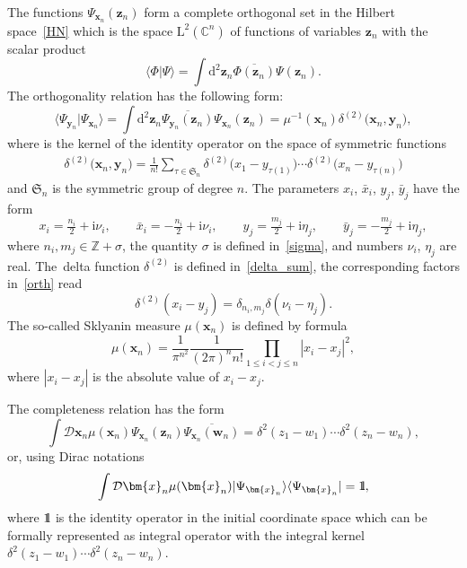 \documentclass[10pt,a4paper]{amsart}
\renewcommand{\imath}{\mathrm{i}}
\newcommand{\II}{\hbox{{1}\kern-.25em\hbox{l}}}
\numberwithin{equation}{section}
\begin{document}
The functions $\Psi_{\bm{x}_n}(\bm{z}_n)$ form a complete orthogonal set in the Hilbert space~\eqref{HN} which is the space $\mathrm{L}^2\left(\mathbb C^{n}\right)$ of functions of
variables $\bm{z}_n$ with the scalar product
\begin{equation*}
	\langle\Phi|\Psi\rangle =
	\int \mathrm{d}^{2}\bm{z}_n \overline{\Phi(\bm{z}_n)} \Psi(\bm{z}_n) .
\end{equation*}
The orthogonality relation has the following form:
\begin{equation} \label{orth}
\langle\Psi_{\bm{y}_n}|\Psi_{\bm{x}_n}\rangle = \int \mathrm{d}^{2}\bm{z}_n \overline{\Psi_{\bm{y}_n}(\bm{z}_n)} \Psi_{\bm{x}_n}(\bm{z}_n) =
	\mu^{-1}(\bm{x}_n) \delta^{(2)}\bigl(\bm{x}_n,\bm{y}_n \bigr) ,
\end{equation}
where  is the kernel of the
identity operator on the space of symmetric functions
\begin{align}\label{deltasym}
\delta^{(2)}\bigl(\bm{x}_n,\bm{y}_n \bigr) =
\frac{1}{n!}\sum\limits_{\tau\in\mathfrak{S}_n}
	\delta^{(2)}\bigl(x_1-y_{\tau(1)}\bigr) \cdots \delta^{(2)}\bigl(x_n-y_{\tau(n)}\bigr)
\end{align}
and $\mathfrak{S}_n$ is the symmetric group of degree $n$.
The parameters $x_i$, $\bar{x}_i$, $y_j$, $\bar{y}_j$ have the form
\begin{equation} \label{xjyk}
	x_i = \tfrac{n_i}{2}+\imath\nu_i, \qquad
	\bar{x}_i = -\tfrac{n_i}{2}+\imath\nu_i ,\qquad
	y_j=\tfrac{m_j}{2}+\imath\eta_j, \qquad
	\bar{y}_j=-\tfrac{m_j}{2}+\imath\eta_j ,
\end{equation}
where $n_i, m_j \in \mathbb{Z}+\sigma$, the quantity $\sigma$ is defined in~\eqref{sigma}, and numbers $\nu_i$, $\eta_j$ are real.
The~delta function $\delta^{(2)}$ is defined in~\eqref{delta_sum}, the corresponding factors in~\eqref{orth} read
\begin{equation*}
	\delta^{(2)}(x_i-y_j) = \delta_{n_i,m_j} \delta(\nu_i-\eta_j) .
\end{equation*}
The so-called Sklyanin measure $\mu(\bm{x}_n)$ is defined by formula
\begin{equation} \label{mu}
\mu(\bm{x}_n) =
\frac{1}{\pi^{n^2}} \frac{1}{(2\pi)^n n!}
\prod\limits_{1\leq i<j\leq n}|x_i-x_j|^2 ,
\end{equation}
where $|x_i-x_j|$ is the absolute value of $x_i-x_j$.

The completeness relation has the form
\begin{equation*}
	\int \mathcal{D}\bm{x}_n \mu(\bm{x}_n)
	\Psi_{\bm{x}_n}(\bm{z}_n) \overline{\Psi_{\bm{x}_n}(\bm{w}_n)} =
	\delta^2(z_1-w_1) \cdots \delta^2(z_n-w_n) ,
\end{equation*}
or, using Dirac notations
\begin{equation*}
\int \mathcal{D}\bm{x}_n \mu(\bm{x}_n)
|\Psi_{\bm{x}_n}\rangle \langle\Psi_{\bm{x}_n}| = \II ,
\end{equation*}
where $\II$ is the identity operator in the initial coordinate space
which can be formally represented as integral operator with the
integral kernel $\delta^2(z_1-w_1) \cdots \delta^2(z_n-w_n)$.
\end{document}
